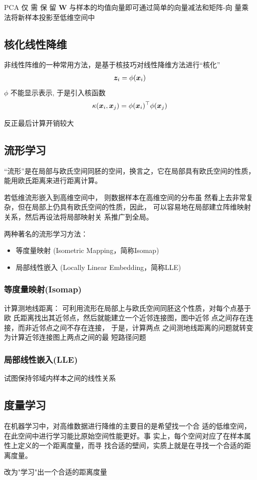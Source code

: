 PCA 仅 需 保 留 $\bm W$ 与样本的均值向量即可通过简单的向量减法和矩阵-向
量乘法将新样本投影至低维空间中

\subsection{核化线性降维}
非线性阵维的一种常用方法，是基于核技巧对线性降维方法进行``核化''
\begin{align*}
    \bm{z}_i=\phi(\bm{x}_i)
\end{align*}
$\phi$ 不能显示表示, 于是引入核函数
\begin{align*}
    \kappa(\bm{x}_i,\bm{x}_j)=\phi(\bm{x}_i)^\top\phi(\bm{x}_j)
\end{align*}

反正最后计算开销较大

\subsection{流形学习}
“流形”是在局部与欧氏空间同胚的空间，换言之，它在局部具有欧氏空间的性质，能用欧氏距离来进行距离计算。

若低维流形嵌入到高维空间中， 则数据样本在高维空间的分布虽
然看上去非常复杂，但在局部上仍具有欧氏空间的性质，因此，
可以容易地在局部建立阵维映射关系，然后再设法将局部映射关
系推广到全局。

两种著名的流形学习方法：
\begin{itemize}
    \item 等度量映射 (Isometric Mapping，简称Isomap)
    \item 局部线性嵌入 (Locally Linear Embedding，简称LLE)
\end{itemize}

\subsubsection{等度量映射(Isomap)}
计算测地线距离：
可利用流形在局部上与欧氏空间同胚这个性质，对每个点基于欧
氏距离找出其近邻点，然后就能建立一个近邻连接图，图中近邻
点之间存在连接，而非近邻点之间不存在连接， 于是，计算两点
之间测地线距离的问题就转变为计算近邻连接图上两点之间的最
短路径问题
\subsubsection{局部线性嵌入(LLE)}
试图保持邻域内样本之间的线性关系

\subsection{度量学习}
在机器学习中，对高维数据进行降维的主要目的是希望找一个合
适的低维空间，在此空间中进行学习能比原始空间性能更好。事
实上，每个空间对应了在样本属性上定义的一个距离度量，而寻
找合适的壁间，实质上就是在寻找一个合适的距离度量。

改为"学习"出一个合适的距离度量